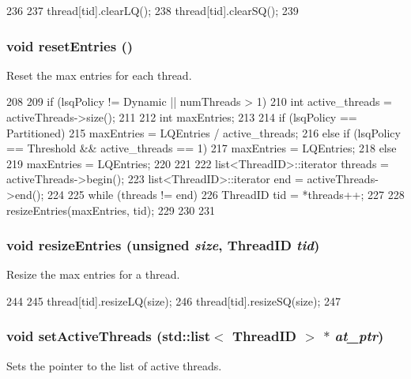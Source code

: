 \begin{DoxyCode}
236 {
237     thread[tid].clearLQ();
238     thread[tid].clearSQ();
239 }
\end{DoxyCode}
\hypertarget{classLSQ_aaf9a05771a835f9f8d634cef36e24d40}{
\subsubsection[{resetEntries}]{\setlength{\rightskip}{0pt plus 5cm}void resetEntries ()}}
\label{classLSQ_aaf9a05771a835f9f8d634cef36e24d40}
Reset the max entries for each thread. 


\begin{DoxyCode}
208 {
209     if (lsqPolicy != Dynamic || numThreads > 1) {
210         int active_threads = activeThreads->size();
211 
212         int maxEntries;
213 
214         if (lsqPolicy == Partitioned) {
215             maxEntries = LQEntries / active_threads;
216         } else if (lsqPolicy == Threshold && active_threads == 1) {
217             maxEntries = LQEntries;
218         } else {
219             maxEntries = LQEntries;
220         }
221 
222         list<ThreadID>::iterator threads  = activeThreads->begin();
223         list<ThreadID>::iterator end = activeThreads->end();
224 
225         while (threads != end) {
226             ThreadID tid = *threads++;
227 
228             resizeEntries(maxEntries, tid);
229         }
230     }
231 }
\end{DoxyCode}
\hypertarget{classLSQ_a3672feee3a3eaad63f2e96d46385a099}{
\subsubsection[{resizeEntries}]{\setlength{\rightskip}{0pt plus 5cm}void resizeEntries (unsigned {\em size}, \/  {\bf ThreadID} {\em tid})}}
\label{classLSQ_a3672feee3a3eaad63f2e96d46385a099}
Resize the max entries for a thread. 


\begin{DoxyCode}
244 {
245     thread[tid].resizeLQ(size);
246     thread[tid].resizeSQ(size);
247 }
\end{DoxyCode}
\hypertarget{classLSQ_aab96bdacf8bd420402cbb543f994e054}{
\subsubsection[{setActiveThreads}]{\setlength{\rightskip}{0pt plus 5cm}void setActiveThreads ({\bf std::list}$<$ {\bf ThreadID} $>$ $\ast$ {\em at\_\-ptr})}}
\label{classLSQ_aab96bdacf8bd420402cbb543f994e054}
Sets the pointer to the list of active threads. 



